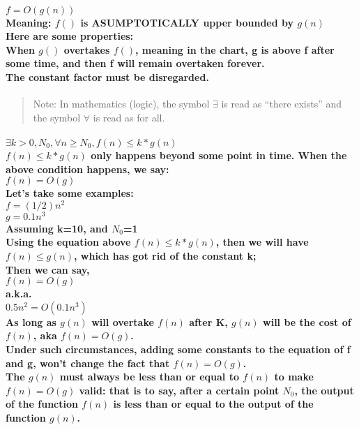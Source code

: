 \documentclass{article}
\begin{document}
\paragraph{$ f = O(g(n)) $\\
Meaning: $f()$ is ASUMPTOTICALLY upper bounded by $g(n)$\\
Here are some properties:\\
When $g()$ overtakes $f()$, meaning in the chart, g is above f after some time, and then f will remain overtaken forever.\\
The constant factor must be disregarded.\\}

\begin{quote}
    Note: In mathematics (logic), the symbol $\exists$ is read as “there exists” and the symbol $\forall$ is read as for all.\\
\end{quote}

\paragraph{$ \exists k>0,N_0, \forall n \geq N_0, f(n) \leq k*g(n) $\\
$f(n) \leq k*g(n)$ only happens beyond some point in time. When the above condition happens, we say:\\
$ f(n) = O(g) $\\
Let's take some examples:\\
$ f=(1/2)n^2 $\\
$ g=0.1n^3 $\\
Assuming k=10, and $N_0$=1\\
Using the equation above $f(n) \leq k*g(n)$, then we will have $f(n) \leq g(n)$, which has got rid of the constant k;\\
Then we can say,\\
$f(n) = O(g) $\\
a.k.a.\\
$0.5n^2=O(0.1n^3) $\\
As long as $g(n)$ will overtake $f(n)$ after K, $g(n)$ will be the cost of $f(n)$, aka $f(n)=O(g)$.\\
Under such circumstances, adding some constants to the equation of f and g, won't change the fact that $f(n)=O(g)$.\\
The $g(n)$ must always be less than or equal to $f(n)$ to make $f(n) = O(g)$ valid: 
that is to say, after a certain point $N_0$, the output of the function $f(n)$ is less than or equal to the output of the function $g(n)$.}
\end{document}
